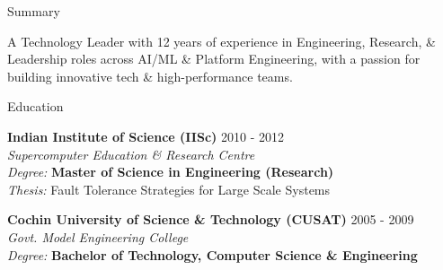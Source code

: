 \documentclass{resume} %
\begin{document}

\begin{rSection}{Summary}

A Technology Leader with 12 years of experience in Engineering, Research, \& Leadership roles across AI/ML \& Platform Engineering, with a passion for building innovative tech \& high-performance teams. 

\end{rSection}


\begin{rSection}{Education}

{\bf Indian Institute of Science (IISc)} \hfill {2010 - 2012} \\ 
{\em Supercomputer Education \& Research Centre} \smallskip \\
{\em Degree:} {\bf Master of Science in Engineering (Research)} \\
{\em Thesis:} Fault Tolerance Strategies for Large Scale Systems

{\bf Cochin University of Science \& Technology (CUSAT)} \hfill {2005 - 2009} \\
{\em Govt. Model Engineering College} \smallskip \\
{\em Degree:} {\bf Bachelor of Technology, Computer Science \& Engineering}

\end{rSection}

\end{document}
